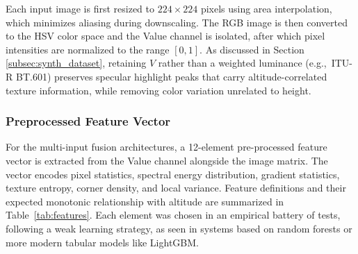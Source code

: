 Each input image is first resized to $224 \times 224$ pixels using area interpolation, which minimizes aliasing during downscaling. The RGB image is then converted to the HSV color space and the Value channel is isolated, after which pixel intensities are normalized to the range $[0,1]$. As discussed in Section \ref{subsec:synth_dataset}, retaining $V$ rather than a weighted luminance (e.g.,\ ITU-R BT.601) preserves specular highlight peaks that carry altitude-correlated texture information, while removing color variation unrelated to height.

\subsubsection{Preprocessed Feature Vector}
\label{subsubsec:features}

For the multi-input fusion architectures, a 12-element pre-processed feature vector is extracted from the Value channel alongside the image matrix. The vector encodes pixel statistics, spectral energy distribution, gradient statistics, texture entropy, corner density, and local variance. Feature definitions and their expected monotonic relationship with altitude are summarized in Table~\ref{tab:features}. Each element was chosen in an empirical battery of tests, following a weak learning strategy, as seen in systems based on random forests or more modern tabular models like LightGBM.

